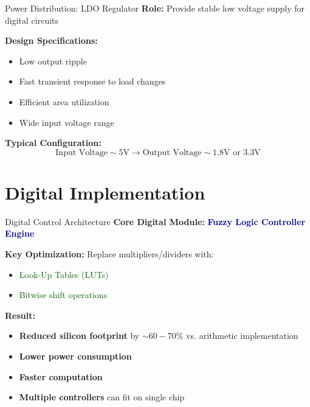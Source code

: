 \documentclass[aspectratio=169,usenames,dvipsnames]{beamer}
\newcommand{\highlight}[1]{\textcolor{darkblue}{\textbf{#1}}}
\begin{document}
\begin{frame}{Power Distribution: LDO Regulator}
    \textbf{Role:} Provide stable low voltage supply for digital circuits
    
    \vspace{0.2cm}
    \textbf{Design Specifications:}
    \begin{itemize}
        \item Low output ripple
        \item Fast transient response to load changes
        \item Efficient area utilization
        \item Wide input voltage range
    \end{itemize}
    
    \vspace{0.3cm}
    \textbf{Typical Configuration:}
    \[\text{Input Voltage} \sim 5\text{V} \rightarrow \text{Output Voltage} \sim 1.8\text{V or } 3.3\text{V}\]
\end{frame}

\section{Digital Implementation}

\begin{frame}{Digital Control Architecture}
    \textbf{Core Digital Module:} \highlight{Fuzzy Logic Controller Engine}
    
    \vspace{0.3cm}
    \textbf{Key Optimization:} Replace multipliers/dividers with:
    \begin{itemize}
        \item \textcolor{darkgreen}{Look-Up Tables (LUTs)}
        \item \textcolor{darkgreen}{Bitwise shift operations}
    \end{itemize}
    
    \vspace{0.3cm}
    \textbf{Result:}
    \begin{itemize}
        \item \textbf{Reduced silicon footprint} by $\sim 60-70\%$ vs. arithmetic implementation
        \item \textbf{Lower power consumption}
        \item \textbf{Faster computation}
        \item \textbf{Multiple controllers} can fit on single chip
    \end{itemize}
\end{frame}
\end{document}
